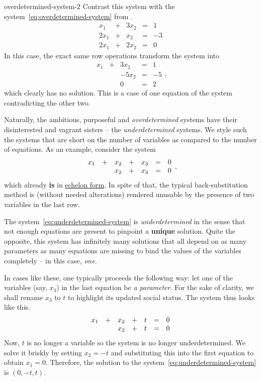 \begin{example}{}{overdetermined-system-2}
 Contrast this system with the system~\eqref{eq:overdetermined-system} from
 .
 \[
  \begin{array}{rcrcr}
    x_1 & + & 3x_2 & = & 1\\
    2x_1 & + & x_2 & = & -3\\
    2x_1 & + & 2x_2 & = & 0
  \end{array}
 \]
 In this case, the exact same row operations transform the system into
 \[
  \begin{array}{rcrcr}
    x_1 & + & 3x_2 & = & 1\\
    & & -5x_2 & = & -5\\
    & & 0 & = & 2
  \end{array},
 \]
 which clearly has no solution. This is a case of one equation of the system
 contradicting the other two.
\end{example}

Naturally, the ambitious, purposeful and \emph{overdetermined} systems have
their disinterested and vagrant sisters -- the \emph{underdetermined} systems.
We style such the systems that are short on the number of variables as compared
to the number of equations. As an example, consider the system
\begin{equation}
 \label{eq:underdetermined-system}
 \begin{array}{r c r c r c r}
  x_1 & + & x_2 & + & x_3 & = & 0\\
      &   & x_2 & + & x_3 & = & 0
 \end{array},
\end{equation}
which already \textbf{is} in \hyperref[def:echelon-form]{echelon form}. In spite
of that, the typical back-substitution method is (without needed alterations)
rendered unusable by the presence of two variables in the last row.

The system~\eqref{eq:underdetermined-system} is \emph{underdetermined} in the
sense that not enough equations are present to pinpoint a \textbf{unique}
solution. Quite the opposite, this system has infinitely many solutions that all
depend on as many parameters as many equations are missing to bind the values of
the variables completely -- in this case, \emph{one}.

In cases like these, one typically proceeds the following way: let one of the
variables (say, $x_3$) in the last equation be \emph{a parameter}. For the sake
of clarity, we shall rename $x_3$ to $t$ to highlight its updated social status.
The system thus looks like this.
\[
 \begin{array}{r c r c r c r}
  x_1 & + & x_2 & + & t & = & 0\\
      &   & x_2 & + & t & = & 0
 \end{array}
\]
Now, $t$ is no longer a variable so the system is no longer underdetermined. We
solve it briskly by setting $x_2 = -t$ and substituting this into the first
equation to obtain $x_1=0$. Therefore, the solution to the
system~\eqref{eq:underdetermined-system} is $(0,-t,t)$.

